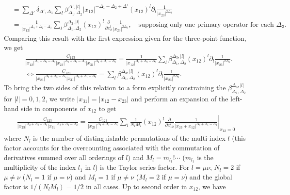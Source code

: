 \documentclass[10pt, a4paper]{article}
\begin{document}
{\begin{enumerate}
\begin{align*}
    &= \sum_{\Delta'} \delta_{\Delta', \Delta_3} \sum_l \beta^{\Delta', |l|}_{\Delta_1, \Delta_2} |x_{12}|^{-\Delta_1 - \Delta_2+\Delta'} (x_{12})^{l} \partial_{l} \frac{1}{|x_{23}|^{2 \Delta_3}}\\
    &= \frac{1}{|x_{12}|^{\Delta_1 + \Delta_2 - \Delta_3}}\sum_l \beta^{\Delta_3, |l|}_{\Delta_1, \Delta_2}  (x_{12})^{l} \frac{\partial}{\partial x^l_2} \frac{1}{|x_{23}|^{2 \Delta_3}}, \quad \text{supposing only one primary operator for each $\Delta_3$}. 
  \end{align*}
  Comparing this result with the first expression given for the three-point function, we get 
  \begin{align*}
    &\frac{C_{123}}{|x_{12}|^{\Delta_1+\Delta_2-\Delta_3} |x_{23}|^{\Delta_2+\Delta_3-\Delta_1} |x_{31}|^{\Delta_3+\Delta_1-\Delta_2}}
    = \frac{1}{|x_{12}|^{\Delta_1 + \Delta_2 - \Delta_3}}\sum_l \beta^{\Delta_3, |l|}_{\Delta_1, \Delta_2}  (x_{12})^{l} \partial_{l} \frac{1}{|x_{23}|^{2 \Delta_3}}. \\
    &\iff \frac{C_{123}}{|x_{23}|^{\Delta_2+\Delta_3-\Delta_1} |x_{31}|^{\Delta_3+\Delta_1-\Delta_2}} =  \sum_l \beta^{\Delta_3, |l|}_{\Delta_1, \Delta_2}  (x_{12})^{l} \partial_{l} \frac{1}{|x_{23}|^{2 \Delta_3}}.
  \end{align*}
  \newpage
  To bring the two sides of this relation to a form explicitly constraining the $\beta^{\Delta_3, |l|}_{\Delta_1, \Delta_2}$ for $|l|=0, 1, 2$, we write $|x_{31}| = |x_{12} - x_{23}|$ and perform an expansion of the left-hand side in components of $x_{12}$ to get 
  \begin{align*}
    \frac{C_{123}}{|x_{23}|^{\Delta_2+\Delta_3-\Delta_1} |x_{31}|^{\Delta_3+\Delta_1-\Delta_2}} =\frac{C_{123}}{|x_{23}|^{\Delta_2+\Delta_3-\Delta_1}} \sum_{l} \frac{1}{N_l M_l} (x_{12})^l \left.\frac{\partial}{\partial x_{12}^{l}} \frac{1}{|x_{23} + x_{12}|^{\Delta_3+\Delta_1-\Delta_2}}\right|_{x_{12} = 0}
  \end{align*}
  where $N_l$ is the number of distinguishable permutations of the multi-index $l$ (this factor accounts for the overcounting associated with the commutation of derivatives summed over all orderings of $l$) and $M_l= m_{l_1}! \cdots $ ($m_{l_1}$ is the multiplicity of the index $l_1$ in $l$) is the Taylor series factor. For $l = \mu \nu$, $N_l = 2$  if $\mu \neq \nu$ ($N_l = 1$ if $\mu = \nu$) and $M_l = 1$ if $\mu \neq \nu$ ($M_l = 2$ if $\mu = \nu$) and the global factor is $1/(N_l M_l) = 1/2$ in all cases.  Up to second order in $x_{12}$, we have 
  \begin{align*}

\end{align*}
\end{enumerate}}
\end{document}
